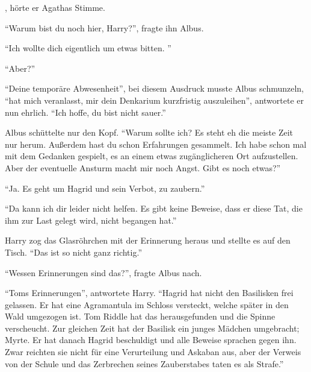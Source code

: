 , hörte er Agathas Stimme.



\enquote{Warum bist du noch hier, Harry?}, fragte ihn Albus.

\enquote{Ich wollte dich eigentlich um etwas bitten. \gst}

\enquote{Aber?}

\enquote{Deine temporäre Abwesenheit\abs}, bei diesem Ausdruck musste Albus schmunzeln, \enquote{hat mich veranlasst, mir dein Denkarium kurzfristig auszuleihen}, antwortete er nun ehrlich. \enquote{Ich hoffe, du bist nicht sauer.}

Albus schüttelte nur den Kopf. \enquote{Warum sollte ich? Es steht eh die meiste Zeit nur herum. Außerdem hast du schon Erfahrungen gesammelt. Ich habe schon mal mit dem Gedanken gespielt, es an einem etwas zugänglicheren Ort aufzustellen. Aber der eventuelle Ansturm macht mir noch Angst. \gst Gibt es noch etwas?}

\enquote{Ja. Es geht um Hagrid und sein Verbot, zu zaubern.}

\enquote{Da kann ich dir leider nicht helfen. Es gibt keine Beweise, dass er diese Tat, die ihm zur Last gelegt wird, nicht begangen hat.}

Harry zog das Glasröhrchen mit der Erinnerung heraus und stellte es auf den Tisch. \enquote{Das ist so nicht ganz richtig.}

\enquote{Wessen Erinnerungen sind das?}, fragte Albus nach.

\enquote{Toms Erinnerungen}, antwortete Harry. \enquote{Hagrid hat nicht den Basilisken frei gelassen. Er hat eine Agramantula im Schloss versteckt, welche später in den Wald umgezogen ist. Tom Riddle hat das herausgefunden und die Spinne verscheucht. Zur gleichen Zeit hat der Basilisk ein junges Mädchen umgebracht; Myrte. Er hat danach Hagrid beschuldigt und alle Beweise sprachen gegen ihn. Zwar reichten sie nicht für eine Verurteilung und Askaban aus, aber der Verweis von der Schule und das Zerbrechen seines Zauberstabes taten es als Strafe.}

